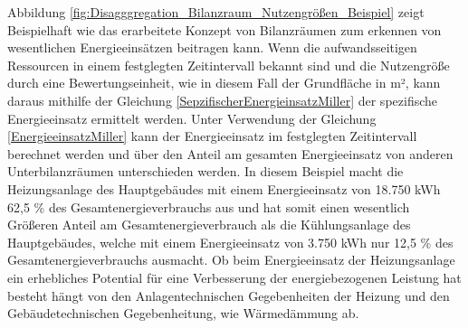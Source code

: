 Abbildung \eqref{fig:Disagggregation_Bilanzraum_Nutzengrößen_Beispiel} zeigt Beispielhaft wie das erarbeitete Konzept von Bilanzräumen zum erkennen von 
wesentlichen Energieeinsätzen beitragen kann. Wenn die aufwandsseitigen Ressourcen in einem festglegten Zeitintervall bekannt sind und die Nutzengröße durch eine 
Bewertungseinheit, wie in diesem Fall der Grundfläche in m², kann daraus mithilfe der Gleichung \eqref{SepzifischerEnergieinsatzMiller} der spezifische 
Energieeinsatz ermittelt werden. 
Unter Verwendung der Gleichung \eqref{EnergieeinsatzMiller} kann der Energieeinsatz im festglegten Zeitintervall berechnet werden und über den Anteil am 
gesamten Energieeinsatz von anderen Unterbilanzräumen unterschieden werden.
In diesem Beispiel macht die Heizungsanlage des Hauptgebäudes mit einem Energieeinsatz von 18.750 kWh 62,5 \% des Gesamtenergieverbrauchs aus und hat somit einen 
wesentlich Größeren Anteil am Gesamtenergieverbrauch als die Kühlungsanlage des Hauptgebäudes, welche mit einem Energieeinsatz von 3.750 kWh nur 12,5 \% des 
Gesamtenergieverbrauchs ausmacht.
Ob beim Energieeinsatz der Heizungsanlage ein erhebliches Potential für eine Verbesserung der energiebezogenen Leistung hat besteht hängt von den 
Anlagentechnischen Gegebenheiten der Heizung und den Gebäudetechnischen Gegebenheitung, wie Wärmedämmung ab.

